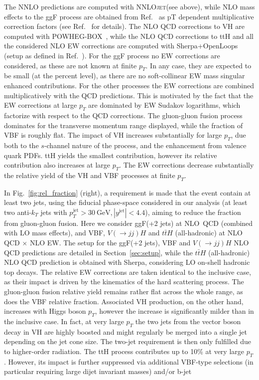 \documentclass[10pt,prd,fleqn,superscriptaddress,notitlepage,nofootinbib,preprintnumbers,nobalancelastpage]{revtex4-1}
\newcommand{\NNLOJET}{\textsc{NNLOjet}\xspace}
\newcommand{\VBF}{VBF\xspace}
\newcommand{\VH}{VH\xspace}
\newcommand{\ttH}{ttH\xspace}
\begin{document}
The NNLO predictions are computed with \NNLOJET (see above), while NLO mass effects to the ggF process are obtained from Ref.~\cite{Jones:2018hbb} as pT dependent multiplicative correction factors (see Ref.~\cite{Becker:2020rjp} for details). The NLO QCD corrections to \VH are computed with POWHEG-BOX~\cite{Luisoni:2013cuh}, while the NLO QCD corrections to \ttH and all the considered NLO EW corrections are computed with Sherpa+OpenLoops~\cite{Gleisberg:2008ta,Kallweit:2014xda,Schonherr:2017qcj,Buccioni:2019sur} (setup as defined in Ref.~\cite{Becker:2020rjp}). 
For the ggF process no EW corrections are considered, as these are not known at finite $p_T$. In any case, they are expected to be small (at the percent level), as there are no soft-collinear EW mass singular enhanced contributions. 
%
For the other processes the EW corrections are combined multiplicatively with the QCD predictions. This is motivated by the fact that the EW corrections at large $p_T$ are dominated by EW Sudakov logarithms, which factorize with respect to the QCD corrections. 
%
The gluon-gluon fusion process dominates for the transverse momentum range displayed, while the fraction of \VBF is roughly flat. The impact of \VH increases substantially for large $p_T$, due both to the $s$-channel nature of the process, and the enhancement from valence quark PDFs. \ttH yields the smallest contribution, however its relative contribution also increases at large $p_T$.
The EW corrections decrease substantially the relative yield of the \VH and \VBF processes at finite $p_T$.

In Fig.~\ref{fig:rel_fraction} (right), a requirement is made that the event contain at least two jets, using the fiducial phase-space considered in our analysis (at least two anti-$k_T$ jets with $p_T^{\text{jet}} > 30\ \text{GeV},  |y^{\text{jet}}|<4.4$), aiming to reduce the fraction from gluon-gluon fusion.
Here we consider ggF(+2 jets) at NLO~QCD (combined with LO mass effects), and \VBF, $V(\to jj)H$ and $t\bar{t}H$ (all-hadronic) at NLO QCD $\times$ NLO EW.
The setup for the ggF(+2 jets), \VBF and $V(\to jj)H$ NLO QCD predictions are detailed in Section~\ref{sec:setup}, while the $t\bar{t}H$ (all-hadronic) NLO QCD prediction is obtained with Sherpa, considering LO on-shell hadronic top decays. The  relative EW corrections are taken identical to the inclusive case, as their impact is driven by the kinematics of the hard scattering process. 
The gluon-gluon fusion relative yield remains rather flat across the whole range, as does the \VBF{} relative fraction.
Associated VH production, on the other hand,  increases with Higgs boson $p_T$,
however the increase is significantly milder than in the inclusive case.
  In fact, at very large $p_T$ the two jets from the vector boson decay in \VH are highly boosted and might regularly be merged into a single jet depending on the jet cone size. The two-jet requirement is then only fulfilled due to higher-order radiation. The \ttH process contributes up to 10\% at very large $p_T$. However, its impact is further suppressed via additional VBF-type selections (in particular requiring large dijet invariant masses) and/or b-jet
\end{document}
